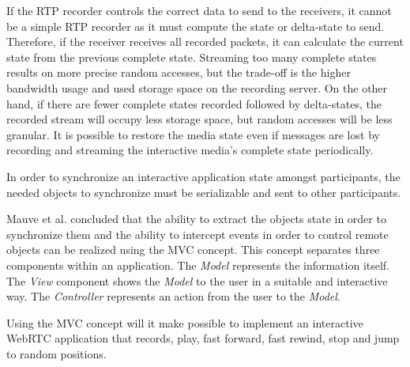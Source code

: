 	If the \ac{RTP} recorder controls the correct data to send to the receivers, it cannot be a simple \ac{RTP} recorder as it must compute the state or delta-state to send. Therefore, if the receiver receives all recorded packets, it can calculate the current state from the previous complete state. Streaming too many complete states results on more precise random accesses, but the trade-off is the higher bandwidth usage and used storage space on the recording server. On the other hand, if there are fewer complete states recorded followed by delta-states, the recorded stream will occupy less storage space, but random accesses will be less granular.
	It is possible to restore the media state even if messages are lost by recording and streaming the interactive media's complete state periodically.

	In order to synchronize an interactive application state amongst participants, the needed objects to synchronize must be serializable and sent to other participants.

	Mauve et al. concluded that the ability to extract the objects state in order to synchronize them and the ability to intercept events in order to control remote objects can be realized using the \ac{MVC} concept\cite{interactive_stream}.
        This concept separates three components within an application. The \emph{Model} represents the information itself. The \emph{View} component shows the \emph{Model} to the user in a suitable and interactive way. The \emph{Controller} represents an action from the user to the \emph {Model}. 

	Using the \ac{MVC} concept will it make possible to implement an interactive \ac{WebRTC} application that records, play, fast forward, fast rewind, stop and jump to random positions.
        
    

